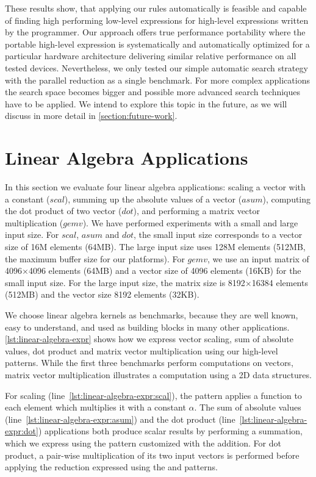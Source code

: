 \bigskip

\noindent
These results show, that applying our rules automatically is feasible and capable of finding high performing low-level expressions for high-level expressions written by the programmer.
Our approach offers true performance portability where the portable high-level expression is systematically and automatically optimized for a particular hardware architecture delivering similar relative performance on all tested devices.
Nevertheless, we only tested our simple automatic search strategy with the parallel reduction as a single benchmark.
For more complex applications the search space becomes bigger and possible more advanced search techniques have to be applied.
We intend to explore this topic in the future, as we will discuss in more detail in \autoref{section:future-work}.




\section{Linear Algebra Applications}

In this section we evaluate four linear algebra applications: scaling a vector with a constant ($scal$), summing up the absolute values of a vector ($asum$), computing the dot product of two vector ($dot$), and performing a matrix vector multiplication ($gemv$).
We have performed experiments with a small and large input size.
For $scal$, $asum$ and $dot$, the small input size corresponds to a vector size of 16M elements (64MB).
The large input size uses 128M elements (512MB, the maximum \OpenCL buffer size for our platforms).
For $gemv$, we use an input matrix of 4096$\times$4096 elements (64MB) and a vector size of 4096 elements (16KB) for the small input size.
For the large input size, the matrix size is 8192$\times$16384 elements (512MB) and the vector size 8192 elements (32KB).

We choose linear algebra kernels as benchmarks, because they are well known, easy to understand, and used as building blocks in many other applications.
\autoref{lst:linear-algebra-expr} shows how we express vector scaling, sum of absolute values, dot product and matrix vector multiplication using our high-level patterns.
While the first three benchmarks perform computations on vectors, matrix vector multiplication illustrates a computation using a 2D data structures.

For scaling (line~\ref{lst:linear-algebra-expr:scal}), the \map pattern applies a function to each element which multiplies it with a constant $\alpha$.
The sum of absolute values (line~\ref{lst:linear-algebra-expr:asum}) and the dot product (line~\ref{lst:linear-algebra-expr:dot}) applications both produce scalar results by performing a summation, which we express using the \reduce pattern customized with the addition.
For dot product, a pair-wise multiplication of its two input vectors is performed before applying the reduction expressed using the \zip and \map patterns.

